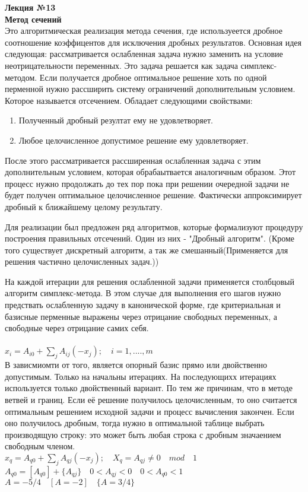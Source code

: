 \LARGE{ \textbf {Лекция №13}}\\

\Large{ \textbf {Метод сечений}}\\

Это алгоритмическая реализация метода сечения, где используеется дробное соотношение коэффицентов для исключения дробных результатов.
Основная идея следующая: рассматривается ослабленная задача нужно заменить на условие неотрицательности переменных.
Это задача решается как задача симплекс-методом.
Если получается дробное оптимальное решение хоть по одной перменной нужно рассширить систему ограничений дополнительным условием.
Которое называется отсечением.
Обладает следующими свойствами:
\begin{enumerate}
  \item Полученный дробный резултат ему не удовлетворяет.
  \item Любое целочисленное допустимое решение ему удовлетворяет.
\end{enumerate}

После этого рассматривается рассширенная ослабленная задача с этим дополнительным условием, которая обрабаытвается аналогичным образом.
Этот процесс нужно продолжать до тех пор пока при решении очередной задачи не будет получен оптимальное целочисленное решение.
Фактически аппроксимирует дробный к ближайшему целому результату.

Для реализации был предложен ряд алгоритмов, которые формализуют процедуру построения правильных отсечений.
Один из них - "Дробный алгоритм". (Кроме того существует дискретный алгоритм,
а так же смешанный(Применяется для решения частично целочисленных задач.))

На каждой итерации для решения ослабленной задачи применяется столбцовый алгоритм симплекс-метода.
В этом случае для выполнения его шагов нужно предствать ослабленную задачу в канонической форме, где критериальная и базисные перменные
выражены через отрицание свободных переменных, а свободные через отрицание самих себя.\\
\\
$x_i = A_{i0} + \sum \limits_j A_{ij}(-x_j); \quad i = 1,....,m $\\

В зависмиомти от того, является опорный базис прямо или двойственно допустимым. Только на начальны итерациях.
На последующихх итерациях используется только двойственный вариант. По тем же причинам, что в методе ветвей и границ.
Если её решение получилось целочисленным, то оно считается оптимальным решением исходной задачи и процесс вычисления закончен.
Если оно получилось дробным, тогда нужно в оптимальной таблице выбрать производящую строку:
это может быть любая строка  с дробным значаением свободным членом.\\
$x_q = A_{q0} + \sum \limits_j A_{qj}(-x_j); \quad X_q = A_{qj} \neq 0 \quad mod \quad 1 $\\
$A_{q0} = [A_{q0}] + \{ A_{qj} \}  \quad  0<A_{qj}<0 \quad 0< A_{q0} <1 $\\
$A = - 5/4 \quad [A=-2] \quad \{A = 3/4 \} $ \\

